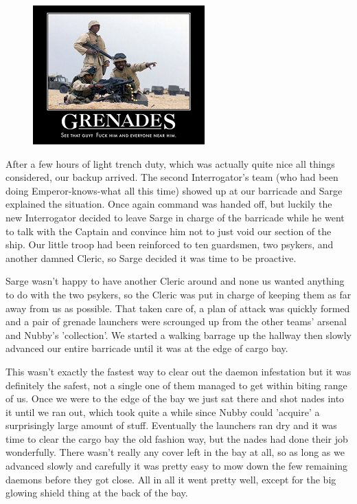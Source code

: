 \begin{figure}
	\begin{center}
		\includegraphics[width=\figwidth]{pics/2/14.png}
	\end{center}
\end{figure}
After a few hours of light trench duty, which was actually quite nice all things considered, our backup arrived. 
The second Interrogator's team (who had been doing Emperor-knows-what all this time) showed up at our barricade and Sarge explained the situation. 
Once again command was handed off, but luckily the new Interrogator decided to leave Sarge in charge of the barricade while he went to talk with the Captain and convince him not to just void our section of the ship. 
Our little troop had been reinforced to ten guardsmen, two psykers, and another damned Cleric, so Sarge decided it was time to be proactive.

Sarge wasn't happy to have another Cleric around and none us wanted anything to do with the two psykers, so the Cleric was put in charge of keeping them as far away from us as possible. 
That taken care of, a plan of attack was quickly formed and a pair of grenade launchers were scrounged up from the other teams' arsenal and Nubby's 'collection'.
We started a walking barrage up the hallway then slowly advanced our entire barricade until it was at the edge of cargo bay. 

This wasn't exactly the fastest way to clear out the daemon infestation but it was definitely the safest, not a single one of them managed to get within biting range of us. 
Once we were to the edge of the bay we just sat there and shot nades into it until we ran out, which took quite a while since Nubby could 'acquire' a surprisingly large amount of stuff. 
Eventually the launchers ran dry and it was time to clear the cargo bay the old fashion way, but the nades had done their job wonderfully. 
There wasn't really any cover left in the bay at all, so as long as we advanced slowly and carefully it was pretty easy to mow down the few remaining daemons before they got close.
All in all it went pretty well, except for the big glowing shield thing at the back of the bay.

